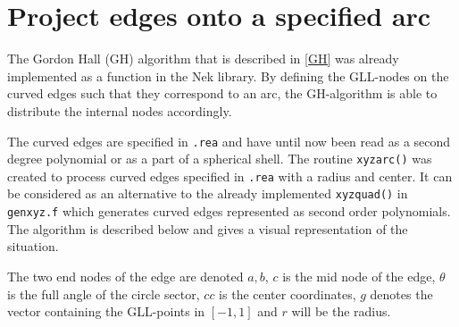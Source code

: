 \section{Project edges onto a specified arc} \label{xyzarc}

The Gordon Hall (GH) algorithm that is described in \cref{GH} was already implemented as a function in the Nek library.
By defining the GLL-nodes on the curved edges such that they correspond to an arc, the GH-algorithm is able to distribute 
the internal nodes accordingly. 

The curved edges are specified in \verb|.rea| and have until now been read as a second degree polynomial or as a part of a 
spherical shell. The routine \verb|xyzarc()| was created to process curved edges specified in \verb|.rea| with a radius and center.
It can be considered as an alternative to the already implemented \verb|xyzquad()| in \verb|genxyz.f| which generates curved edges 
represented as second order polynomials.
The algorithm is described below and  gives a visual representation of the situation.

The two end nodes of the edge are denoted $a,b$, 
$c$ is the mid node of the edge, 
$\theta$ is the full angle of the circle sector,
$cc$ is the center coordinates, 
$g$ denotes the vector containing the GLL-points in $[-1,1]$ 
and $r$ will be the radius.

